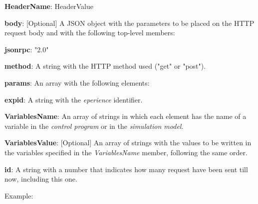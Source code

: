 \begin{myEnumerate}
\begin{myEnumerate}
\begin{myEnumerate}
\begin{myEnumerate}
                    \begin{myEnumerate}
                        \item \textbf{HeaderName}: HeaderValue
                    \end{myEnumerate}
                    \item \textbf{body}: [Optional] A JSON object with the parameters to be placed on the HTTP request body and with the following top-level members:
                    \begin{myEnumerate}
                        \item \textbf{jsonrpc}: "2.0"
                        \item \textbf{method}: A string with the HTTP method used ("get" or "post").
                        \item \textbf{params}: An array with the following elements:
                        \begin{myEnumerate}
                            \item \textbf{expid}: A string with the \textit{eperience} identifier.
                            \item \textbf{VariablesName}: An array of strings in which each element has the name of a variable in the \textit{control program} or in the \textit{simulation model}.
                            \item \textbf{VariablesValue}: [Optional] An array of strings with the values to be written in the variables specified in the \textit{VariablesName} member, following the same order.
                        \end{myEnumerate}
                        \item \textbf{id}: A string with a number that indicates how many request have been sent till now, including this one.
                    \end{myEnumerate}
            \end{myEnumerate}
        \end{myEnumerate}
    \end{myEnumerate}
\end{myEnumerate}

Example:

